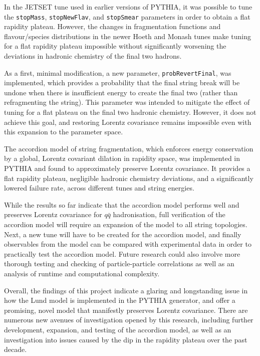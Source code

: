 \documentclass[12pt,a4paper]{report}
\begin{document}
In the JETSET tune used in earlier versions of PYTHIA, it was possible to tune the \texttt{stopMass}, \texttt{stopNewFlav}, and \texttt{stopSmear} parameters in order to obtain a flat rapidity plateau. However, the changes in fragmentation functions and flavour/species distributions in the newer Hoeth and Monash tunes make tuning for a flat rapidity plateau impossible without significantly worsening the deviations in hadronic chemistry of the final two hadrons.

As a first, minimal modification, a new parameter, \texttt{probRevertFinal}, was implemented, which provides a probability that the final string break will be undone when there is insufficient energy to create the final two (rather than refragmenting the string). This parameter was intended to mitigate the effect of tuning for a flat plateau on the final two hadronic chemistry. However, it does not achieve this goal, and restoring Lorentz covariance remains impossible even with this expansion to the parameter space.

The accordion model of string fragmentation, which enforces energy conservation by a global, Lorentz covariant dilation in rapidity space, was implemented in PYTHIA and found to approximately preserve Lorentz covariance. It provides a flat rapidity plateau, negligible hadronic chemistry deviations, and a significantly lowered failure rate, across different tunes and string energies.

While the results so far indicate that the accordion model performs well and preserves Lorentz covariance for $q\bar{q}$ hadronisation, full verification of the accordion model will require an expansion of the model to all string topologies. Next, a new tune will have to be created for the accordion model, and finally observables from the model can be compared with experimental data in order to practically test the accordion model. Future research could also involve more thorough testing and checking of particle-particle correlations as well as an analysis of runtime and computational complexity.

Overall, the findings of this project indicate a glaring and longstanding issue in how the Lund model is implemented in the PYTHIA generator, and offer a promising, novel model that manifestly preserves Lorentz covariance. There are numerous new avenues of investigation opened by this research, including further development, expansion, and testing of the accordion model, as well as an investigation into issues caused by the dip in the rapidity plateau over the past decade.
\end{document}
